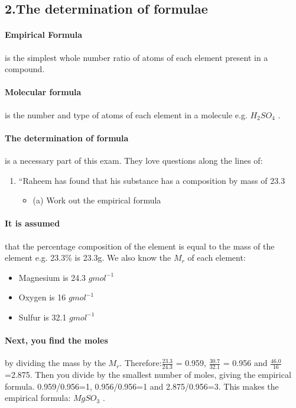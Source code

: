 \subsection{2.The determination of formulae}
\paragraph{Empirical Formula} is the simplest whole number ratio of atoms of each element present in a compound.
\paragraph{Molecular formula} is the number and type of atoms of each element in a molecule e.g. \(H_2SO_4\) .
\paragraph{The determination of formula} is a necessary part of this exam. They love questions along the lines of:
\begin{enumerate}
\item “Raheem has found that his substance has a composition by mass of  23.3%
\begin{itemize}
\item (a) Work out the empirical formula
\end{itemize}
\end{enumerate}
\paragraph{It is assumed} that the percentage composition of the element is equal to the mass of the element e.g. 23.3\% is 23.3g. We also know the \(M_r\) of each element:
\begin{itemize}
\item Magnesium is 24.3 \(gmol^{-1}\)
\item Oxygen is 16 \(gmol^{-1}\)
\item Sulfur is 32.1 \(gmol^{-1}\)
\end{itemize}
\paragraph{Next, you find the moles} by dividing the mass by the \(M_r\). 
\newline Therefore:\(\frac{23.3}{24.3}\) = 0.959, \(\frac{30.7}{32.1}\) = 0.956 and \(\frac{46.0}{16}\) =2.875. Then you divide by the smallest number of moles, giving the empirical formula. 0.959/0.956=1, 0.956/0.956=1 and 2.875/0.956=3. This makes the empirical  formula: \(MgSO_3\) .
